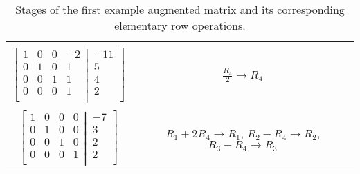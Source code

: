 \documentclass{article}
\begin{document}
\begin{table}[h]
\begin{tabular}{c|c}
\\
\\

$\left[
  \begin{matrix}
    1 & 0 & 0 & -2\\  
 0 & 1 & 0 & 1 \\
 0 & 0 & 1 & 1\\
 0 & 0 & 0 & 1 \\
  \end{matrix}
  \left|
    \,
    \begin{matrix}
      -11  \\
      5  \\
      4  \\
      2  \\
    \end{matrix}
  \right.
\right]$ & $\frac{R_{4}}{2}  \rightarrow R_{4}$

\\
\\

$\left[
  \begin{matrix}
    1 & 0 & 0 & 0\\  
 0 & 1 & 0 & 0 \\
 0 & 0 & 1 & 0\\
 0 & 0 & 0 & 1 \\
  \end{matrix}
  \left|
    \,
    \begin{matrix}
      -7  \\
      3  \\
      2  \\
      2  \\
    \end{matrix}
  \right.
\right]$ & $R_{1} + 2R_{4}  \rightarrow R_{1}$, $R_{2} - R_{4}  \rightarrow R_{2}$, 	$R_{3} - R_{4}  \rightarrow R_{3}$

    \end{tabular}
    \caption{Stages of the first example augmented matrix and its corresponding elementary row operations.}
   \end{table}
   
\end{document}
